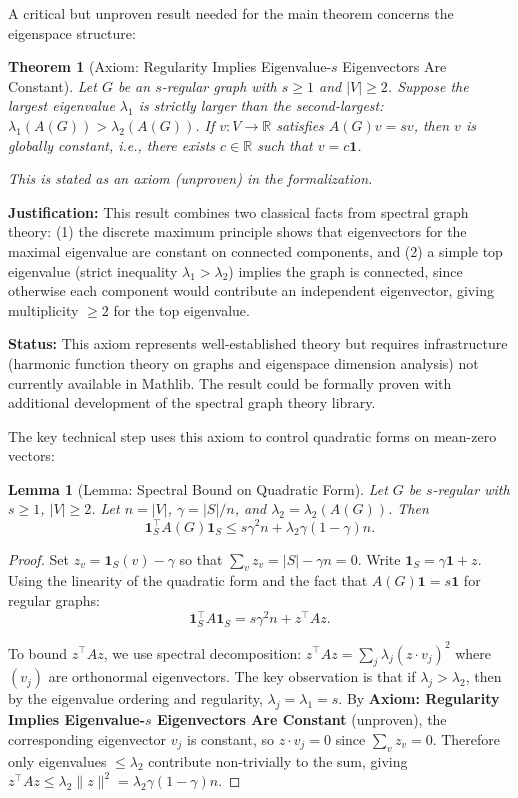 \documentclass[11pt]{article}
\theoremstyle{plain}
\newtheorem*{theorem}{Theorem}
\newtheorem*{lemma}{Lemma}
\theoremstyle{definition}
\theoremstyle{remark}
\begin{document}
A critical but unproven result needed for the main theorem concerns the eigenspace structure:

\begin{theorem}[Axiom: Regularity Implies Eigenvalue-$s$ Eigenvectors Are Constant]
Let $G$ be an $s$-regular graph with $s \geq 1$ and $|V| \geq 2$. Suppose the largest eigenvalue $\lambda_1$ is strictly larger than the second-largest: $\lambda_1(A(G)) > \lambda_2(A(G))$. If $v : V \to \mathbb{R}$ satisfies $A(G)v = sv$, then $v$ is globally constant, i.e., there exists $c \in \mathbb{R}$ such that $v = c\mathbf{1}$.

\textit{This is stated as an axiom (unproven) in the formalization.}
\end{theorem}

\textbf{Justification:} This result combines two classical facts from spectral graph theory: (1) the discrete maximum principle shows that eigenvectors for the maximal eigenvalue are constant on connected components, and (2) a simple top eigenvalue (strict inequality $\lambda_1 > \lambda_2$) implies the graph is connected, since otherwise each component would contribute an independent eigenvector, giving multiplicity $\geq 2$ for the top eigenvalue.

\textbf{Status:} This axiom represents well-established theory but requires infrastructure (harmonic function theory on graphs and eigenspace dimension analysis) not currently available in Mathlib. The result could be formally proven with additional development of the spectral graph theory library.

The key technical step uses this axiom to control quadratic forms on mean-zero vectors:

\begin{lemma}[Lemma: Spectral Bound on Quadratic Form]
Let $G$ be $s$-regular with $s \geq 1$, $|V| \geq 2$. Let $n = |V|$, $\gamma = |S|/n$, and $\lambda_2 = \lambda_2(A(G))$. Then
\[
\mathbf{1}_S^{\top} A(G) \mathbf{1}_S \leq s\gamma^2 n + \lambda_2 \gamma(1-\gamma)n.
\]
\end{lemma}

\begin{proof}
Set $z_v = \mathbf{1}_S(v) - \gamma$ so that $\sum_v z_v = |S| - \gamma n = 0$. Write $\mathbf{1}_S = \gamma\mathbf{1} + z$. Using the linearity of the quadratic form and the fact that $A(G)\mathbf{1} = s\mathbf{1}$ for regular graphs:
\[
\mathbf{1}_S^{\top} A \mathbf{1}_S = s\gamma^2 n + z^{\top} Az.
\]

To bound $z^{\top} Az$, we use spectral decomposition: $z^{\top} Az = \sum_j \lambda_j (z \cdot v_j)^2$ where $(v_j)$ are orthonormal eigenvectors. The key observation is that if $\lambda_j > \lambda_2$, then by the eigenvalue ordering and regularity, $\lambda_j = \lambda_1 = s$. By \textbf{Axiom: Regularity Implies Eigenvalue-$s$ Eigenvectors Are Constant} (unproven), the corresponding eigenvector $v_j$ is constant, so $z \cdot v_j = 0$ since $\sum_v z_v = 0$. Therefore only eigenvalues $\leq \lambda_2$ contribute non-trivially to the sum, giving $z^{\top} Az \leq \lambda_2 \|z\|^2 = \lambda_2 \gamma(1-\gamma)n$.
\end{proof}
\end{document}

